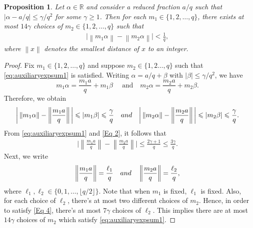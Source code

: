 \documentclass[11pt]{amsart}
\numberwithin{equation}{section}
\numberwithin{figure}{section}
\newtheorem{proposition}{Proposition}[section]
\theoremstyle{definition}
\newcommand{\norm}[1]{\left\lVert#1\right\rVert}
\begin{document}
\begin{proposition}\label{Prop7}
Let $\alpha\in \mathbb{R}$ and consider a reduced fraction $a/q$ such that $|\alpha-a/q|\leqslant\gamma/q^2$ for some $\gamma \geqslant 1$. Then for each $m_1 \in \{1,2,\dots,q\}$, there exists at most $14 \gamma$ choices of $m_2 \in \{1,2,\dots,q \}$ such that
\begin{align} \label{eq:auxiliaryexpsum1}
\bigg \lvert \norm{m_1\alpha}- \norm{m_2\alpha} \bigg \rvert < \frac{1}{q},
\end{align}
where $\norm{x}$ denotes the smallest distance of $x$ to an integer.
\end{proposition}
\begin{proof}
Fix $m_1 \in \{1,2,\dots, q\}$ and suppose $m_2 \in \{1,2\dots,q\}$ such that \eqref{eq:auxiliaryexpsum1} is satisfied.
Writing $\alpha=a/q+\beta$ with $\lvert \beta \rvert  \leqslant\gamma/q^2$, we have
\[m_1 \alpha =  \frac{m_1a}{q}+m_1\beta \quad \textrm{ and} \quad m_2 \alpha =  \frac{m_2a}{q}+m_2\beta. \]
Therefore, we obtain
\begin{align}\label{Eq 2}
\bigg \lvert \norm{m_1\alpha}- \norm{\frac{m_1 a}{q}} \bigg \rvert \leqslant\lvert m_1\beta \rvert \leqslant\frac{\gamma}{q} 
\quad \textnormal{and} \quad 
\bigg \lvert \norm{m_2\alpha}- \norm{\frac{m_2 a}{q}} \bigg \rvert \leqslant\lvert m_2\beta \rvert \leqslant\frac{\gamma}{q}.
\end{align}
From \eqref{eq:auxiliaryexpsum1} and \eqref{Eq 2}, 
it follows that
\begin{align}\label{Eq 4}
\bigg \lvert \norm{\frac{m_1 a}{q}}- \norm{\frac{m_2 a}{q}} \bigg \rvert \leqslant \frac{2\gamma+1}{q} \leqslant\frac{3\gamma}{q}.
\end{align}
Next, we write 
\[
\norm{\frac{m_1 a}{q}} = \frac{\ell_1}{q} \quad \textnormal{and} \quad \norm{\frac{m_2 a}{q}} = \frac{\ell_2}{q},
\]
where $\ell_1, \ell_2 \in \{0,1,\dots,\lfloor q/2\rfloor \}$. Note that when $m_1$ is fixed, $\ell_1$ is fixed. Also, for each choice of $\ell_2$, there's at most two different choices of $m_2$. Hence, in order to satisfy \eqref{Eq 4}, there's at most $7\gamma$ choices of $\ell_2$. This implies there are at most $14 \gamma$ choices of $m_2$ which satisfy \eqref{eq:auxiliaryexpsum1}.
\end{proof}
\end{document}
